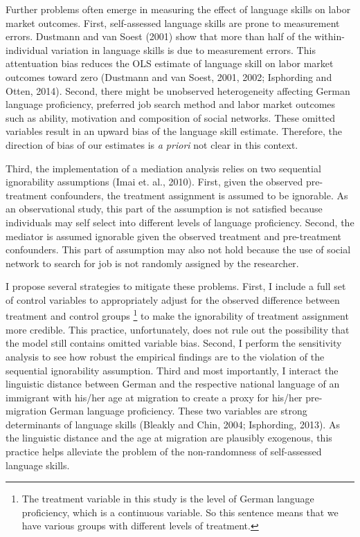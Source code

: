 \documentclass[12pt,a4paper]{article}
\begin{document}
Further problems often emerge in measuring the effect of language skills on labor market outcomes. First, self-assessed language skills are prone to measurement errors. Dustmann and van Soest (2001) show that more than half of the within-individual variation in language skills is due to measurement errors. This attentuation bias reduces the OLS estimate of language skill on labor market outcomes toward zero (Dustmann and van Soest, 2001, 2002; Isphording and Otten, 2014). Second, there might be unobserved heterogeneity affecting German language proficiency, preferred job search method and labor market outcomes such as ability, motivation and composition of social networks. These omitted variables result in an upward bias of the language skill estimate. Therefore, the direction of bias of our estimates is \textit{a priori} not clear in this context.

Third, the implementation of a mediation analysis relies on two sequential ignorability assumptions (Imai et. al., 2010). First, given the observed pre-treatment confounders, the treatment assignment is assumed to be ignorable. As an observational study, this part of the assumption is not satisfied because individuals may self select into different levels of language proficiency. Second, the mediator is assumed ignorable given the observed treatment and pre-treatment confounders. This part of assumption may also not hold because the use of social network to search for job is not randomly assigned by the researcher.

I propose several strategies to mitigate these problems. First, I include a full set of control variables to appropriately adjust for the observed difference between treatment and control groups \footnote {\tiny {The treatment variable in this study is the level of German language proficiency, which is a continuous variable. So this sentence means that we have various groups with different levels of treatment.}} to make the ignorability of treatment assignment more credible. This practice, unfortunately, does not rule out the possibility that the model still contains omitted variable bias. Second, I perform the sensitivity analysis to see how robust the empirical findings are to the violation of the sequential ignorability assumption. Third and most importantly, I interact the linguistic distance between German and the respective national language of an immigrant with his/her age at migration to create a proxy for his/her pre-migration German language proficiency. These two variables are strong determinants of language skills (Bleakly and Chin, 2004; Isphording, 2013). As the linguistic distance and the age at migration are plausibly exogenous, this practice helps alleviate the problem of the non-randomness of self-assessed language skills.
\end{document}
